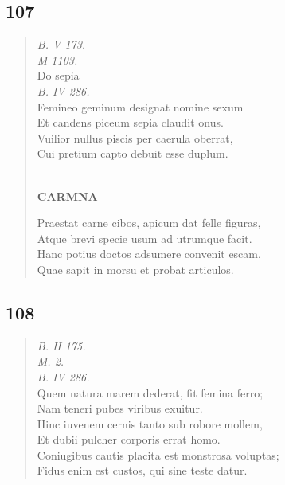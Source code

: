 \documentclass[11pt, a4paper]{report}
\begin{document}
            \subsection*{107}
      \begin{verse}
      \textit{B. V 173.} \\ \textit{M 1103.} \\ Do sepia \\ \textit{B. IV 286.} \\ Femineo geminum designat nomine sexum \\ Et candens piceum sepia claudit onus. \\ Vuilior nullus piscis per caerula oberrat, \\ Cui pretium capto debuit esse duplum. \\ 
        ﻿\pagebreak 
    \begin{center} \textbf{CARMNA} \end{center} \marginpar{[128]} Praestat carne cibos, apicum dat felle figuras, \\ Atque brevi specie usum ad utrumque facit. \\ Hanc potius doctos adsumere convenit escam, \\ Quae sapit in morsu et probat articulos. \\ 
      \end{verse}
  
            \subsection*{108}
      \begin{verse}
      \textit{B. II 175.} \\ \textit{M. 2.} \\ \textit{B. IV 286.} \\ Quem natura marem dederat, fit femina ferro; \\ Nam teneri pubes viribus exuitur. \\ Hinc iuvenem cernis tanto sub robore mollem, \\ Et dubii pulcher corporis errat homo. \\ Coniugibus cautis placita est monstrosa voluptas; \\ Fidus enim est custos, qui sine teste datur. \\ 
      \end{verse}
  
\end{document}
